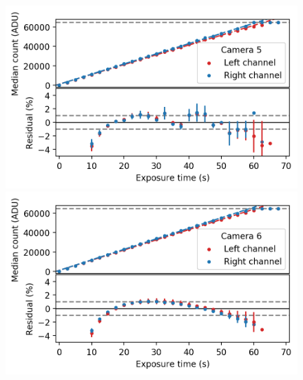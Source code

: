 \begin{colsection}
\begin{colsection}
\begin{figure}[p]
\begin{center}
        \begin{minipage}[t]{0.47\textwidth}\vspace{10pt}
            \includegraphics[width=\linewidth]{images/detectors/lin_5.png}
        \end{minipage}
        \begin{minipage}[t]{0.47\textwidth}\vspace{10pt}
            \includegraphics[width=\linewidth]{images/detectors/lin_6.png}
        \end{minipage}


\end{center}
\end{figure}
\end{colsection}
\end{colsection}
